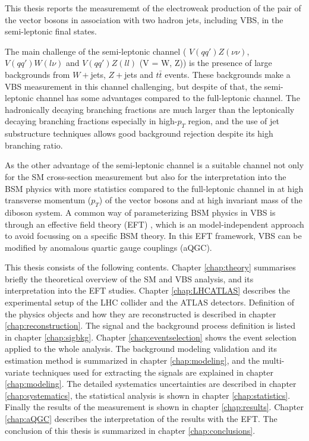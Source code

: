 %
This thesis reports the measurememt of the electroweak production of the pair of the vector bosons in association with two hadron jets, including VBS, in the semi-leptonic final states.

The main challenge of the semi-leptonic channel ( $V(qq')Z(\nu\nu)$, $V(qq')W(l\nu)$ and $V(qq')Z(ll)$ (V = W, Z)) is the presence of large backgrounds from $W + $jets, $Z + $jets and $t\bar{t}$ events. 
These backgrounds make a VBS measurement in this channel challenging, but despite of that, the semi-leptonic channel has some advantages compared to the full-leptonic channel. 
The hadronically decaying branching fractions are much larger than the leptonically decaying branching fractions especially in high-$p_T$ region, and the use of jet substructure techniques allows good background rejection despite its high branching ratio. 

As the other advantage of the semi-leptonic channel is a suitable channel not only for the SM cross-section measurement but also for the interpretation into the BSM physics with more statistics compared to the full-leptonic channel in at high transverse momentum ($p_T$) of the vector bosons and at high invariant mass of the diboson system.
A common way of parameterizing BSM physics in VBS is through an effective field theory (EFT) \cite{Longhitano:1980tm}, which is an model-independent approach to avoid focussing on a specific BSM theory. In this EFT framework, VBS can be modified by anomalous quartic gauge couplings (aQGC). 


This thesis consists of the following contents.
Chapter \ref{chap:theory} summarises briefly the theoretical overview of the SM and VBS analysis, and its interpretation into the EFT studies. 
Chapter \ref{chap:LHCATLAS} describes the experimental setup of the LHC collider and the ATLAS detectors. 
Definition of the physics objects and how they are reconstructed is described in chapter \ref{chap:reconstruction}. 
The signal and the background process definition is listed in chapter \ref{chap:sigbkg}. Chapter \ref{chap:eventselection} shows the event selection applied to the whole analysis.
The background modeling validation and its estimation method is summarized in chapter \ref{chap:modeling}, and the multi-variate techniques used for extracting the signals are explained in chapter \ref{chap:modeling}. The detailed systematics uncertainties are described in chapter \ref{chap:systematics}, the statistical analysis is shown in chapter \ref{chap:statistics}. Finally the results of the measurement is shown in chapter \ref{chap:results}. Chapter \ref{chap:aQGC} describes the interpretation of the results with the EFT. The conclusion of this thesis is summarized in chapter \ref{chap:conclusions}.
